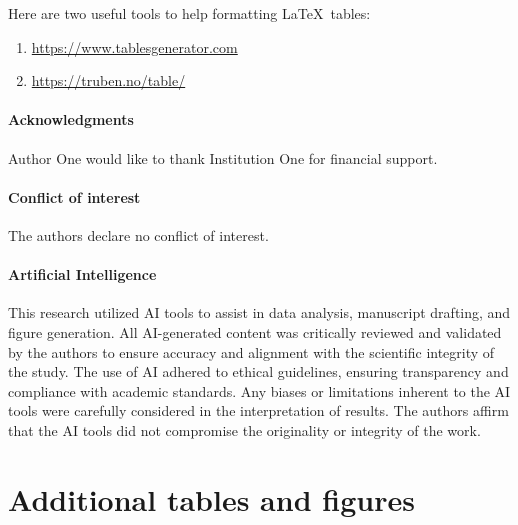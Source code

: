 \documentclass[fleqn]{rbfin}
\begin{document}
Here are two useful tools to help formatting \LaTeX\ tables:
\begin{enumerate}[label = (\roman*), itemsep=0pt]
\item \url{https://www.tablesgenerator.com}
\item \url{https://truben.no/table/}
\end{enumerate}


\paragraph{Acknowledgments}
Author One would like to thank Institution One for financial support.

\paragraph{Conflict of interest} The authors declare no conflict of interest.

\paragraph{Artificial Intelligence} This research utilized AI tools to assist in data analysis, manuscript drafting, and figure generation. All AI-generated content was critically reviewed and validated by the authors to ensure accuracy and alignment with the scientific integrity of the study. The use of AI adhered to ethical guidelines, ensuring transparency and compliance with academic standards. Any biases or limitations inherent to the AI tools were carefully considered in the interpretation of results. The authors affirm that the AI tools did not compromise the originality or integrity of the work.

\label{refs}




\rbfinappendix
\section{Additional tables and figures}
\end{document}
